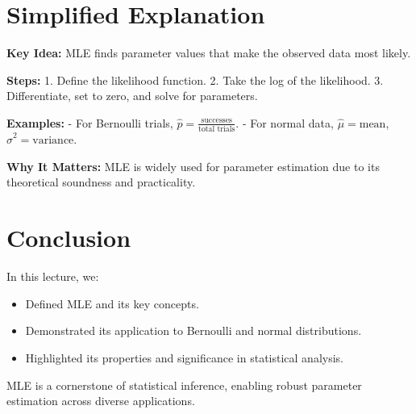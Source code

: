 \documentclass{article}
\begin{document}
\section*{Simplified Explanation}

\textbf{Key Idea:}
MLE finds parameter values that make the observed data most likely.

\textbf{Steps:}
1. Define the likelihood function.
2. Take the log of the likelihood.
3. Differentiate, set to zero, and solve for parameters.

\textbf{Examples:}
- For Bernoulli trials, $\hat{p} = \frac{\text{successes}}{\text{total trials}}$.
- For normal data, $\hat{\mu} = \text{mean}$, $\hat{\sigma}^2 = \text{variance}$.

\textbf{Why It Matters:}
MLE is widely used for parameter estimation due to its theoretical soundness and practicality.

\section*{Conclusion}

In this lecture, we:
\begin{itemize}
  \item Defined MLE and its key concepts.
  \item Demonstrated its application to Bernoulli and normal distributions.
  \item Highlighted its properties and significance in statistical analysis.
\end{itemize}

MLE is a cornerstone of statistical inference, enabling robust parameter estimation across diverse applications.
\end{document}

